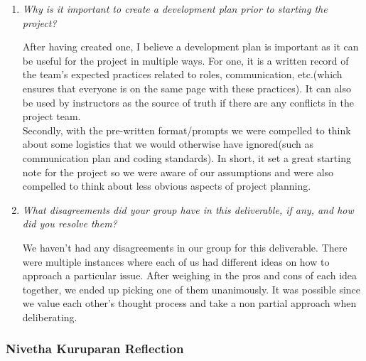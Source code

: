 \documentclass{article}
\begin{document}
\begin{enumerate}
  \item \textit{Why is it important to create a development plan prior to starting the project?}

   After having created one, I believe a development plan is important as it can be useful for the project in multiple ways. For one, it is a written record of the team's expected practices related to roles, communication, etc.(which ensures that everyone is on the same page with these practices). It can also be used by instructors as the source of truth if there are any conflicts in the project team.\\

   Secondly, with the pre-written format/prompts we were compelled to think about some logistics that we would otherwise have ignored(such as communication plan and coding standards). In short, it set a great starting note for the project so we were aware of our assumptions and were also compelled to think about less obvious aspects of project planning.

  \item \textit{What disagreements did your group have in this deliverable, if any, and how did you resolve them?}

  We haven’t had any disagreements in our group for this deliverable. There were multiple instances where each of us had different ideas on how to approach a particular issue. After weighing in the pros and cons of each idea together, we ended up picking one of them unanimously. It was possible since we value each other’s thought process and take a non partial approach when deliberating.

\end{enumerate}

\subsubsection*{Nivetha Kuruparan Reflection}
\end{document}
